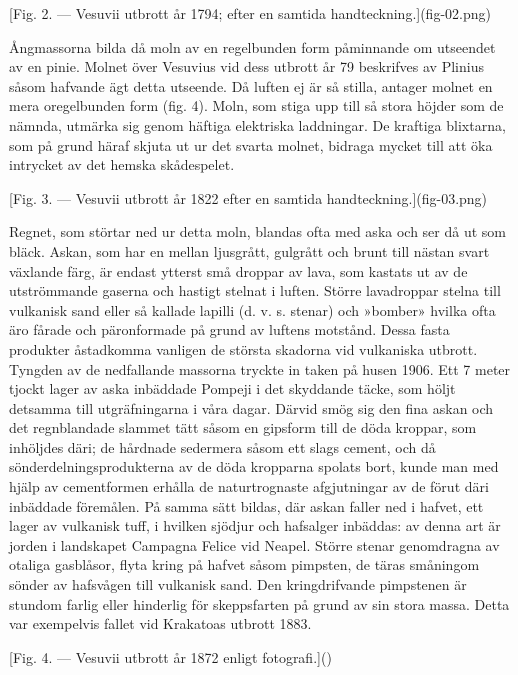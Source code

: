 \documentclass[a4paper, 12pt, oneside, swedish]{article}
\begin{document}
[Fig. 2. --- Vesuvii utbrott år 1794; efter en samtida handteckning.](fig-02.png)

Ångmassorna bilda då moln av en regelbunden form påminnande om utseendet av en pinie. Molnet över Vesuvius vid dess utbrott år 79 beskrifves av Plinius såsom hafvande ägt detta utseende. Då luften ej är så stilla, antager molnet en mera oregelbunden form (fig. 4). Moln, som stiga upp till så stora höjder som de nämnda, utmärka sig genom häftiga elektriska laddningar. De kraftiga blixtarna, som på grund häraf skjuta ut ur det svarta molnet, bidraga mycket till att öka intrycket av det hemska skådespelet.

[Fig. 3. --- Vesuvii utbrott år 1822 efter en samtida handteckning.](fig-03.png)

Regnet, som störtar ned ur detta moln, blandas ofta med aska och ser då ut som bläck. Askan, som har en mellan ljusgrått, gulgrått och brunt till nästan svart växlande färg, är endast ytterst små droppar av lava, som kastats ut av de utströmmande gaserna och hastigt stelnat i luften. Större lavadroppar stelna till vulkanisk sand eller så kallade lapilli (d. v. s. stenar) och »bomber» hvilka ofta äro fårade och päronformade på grund av luftens motstånd. Dessa fasta produkter åstadkomma vanligen de största skadorna vid vulkaniska utbrott. Tyngden av de nedfallande massorna tryckte in taken på husen 1906. Ett 7 meter tjockt lager av aska inbäddade Pompeji i det skyddande täcke, som höljt detsamma till utgräfningarna i våra dagar. Därvid smög sig den fina askan och det regnblandade slammet tätt såsom en gipsform till de döda kroppar, som inhöljdes däri; de hårdnade sedermera såsom ett slags cement, och då sönderdelningsprodukterna av de döda kropparna spolats bort, kunde man med hjälp av cementformen erhålla de naturtrognaste afgjutningar av de förut däri inbäddade föremålen. På samma sätt bildas, där askan faller ned i hafvet, ett lager av vulkanisk tuff, i hvilken sjödjur och hafsalger inbäddas: av denna art är jorden i landskapet Campagna Felice vid Neapel. Större stenar genomdragna av otaliga gasblåsor, flyta kring på hafvet såsom pimpsten, de täras småningom sönder av hafsvågen till vulkanisk sand. Den kringdrifvande pimpstenen är stundom farlig eller hinderlig för skeppsfarten på grund av sin stora massa. Detta var exempelvis fallet vid Krakatoas utbrott 1883.

[Fig. 4. --- Vesuvii utbrott år 1872 enligt fotografi.]()
\end{document}
